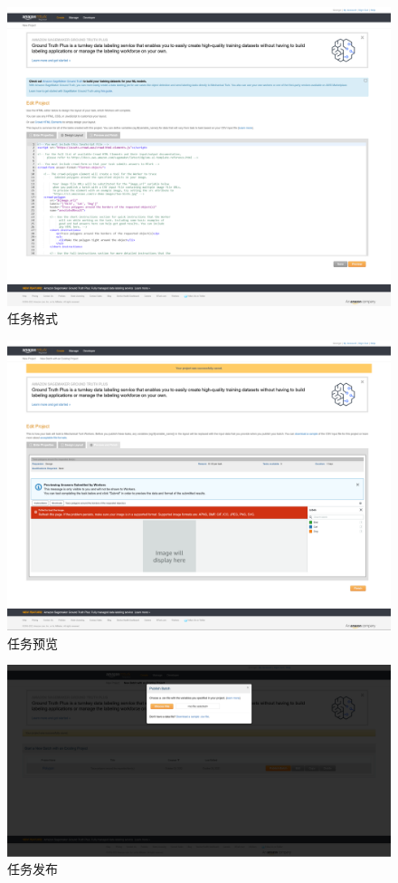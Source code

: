 \begin{figure}[h!]
    \centering
    \includegraphics[width=0.7\linewidth]{imgs/layout.png}
    \caption{任务格式}
    \label{fig:layout}
\end{figure}

\begin{figure}[h!]
    \centering
    \includegraphics[width=0.7\linewidth]{imgs/preview.png}
    \caption{任务预览}
    \label{fig:preview}
\end{figure}

\newpage

\begin{figure}[h!]
    \centering
    \includegraphics[width=\linewidth]{imgs/publish.png}
    \caption{任务发布}
    \label{fig:publish}
\end{figure}